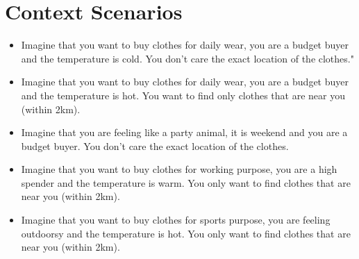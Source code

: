 \chapter{Context Scenarios} \label{appendix:cs}

\begin{itemize}
\item{Imagine that you want to buy clothes for daily wear, you are a budget buyer and the temperature is cold. You don't care the exact location of the clothes."}
\item{Imagine that you want to buy clothes for daily wear, you are a budget buyer and the temperature is hot. You want to find only clothes that are near you (within 2km).}
\item{Imagine that you are feeling like a party animal, it is weekend and you are a budget buyer. You don't care the exact location of the clothes.}
\item{Imagine that you want to buy clothes for working purpose, you are a high spender and the temperature is warm. You only want to find clothes that are near you (within 2km).}
\item{Imagine that you want to buy clothes for sports purpose, you are feeling outdoorsy and the temperature is hot. You only want to find clothes that are near you (within 2km).}
\end{itemize}








